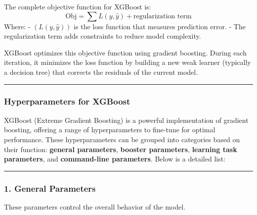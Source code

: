 \documentclass[12pt]{book}
\begin{document}
The complete objective function for XGBoost is: \[
\text{Obj} = \sum L(y, \hat{y}) + \text{regularization term}
\] Where: - \((L(y, \hat{y}))\) is the loss function that measures
prediction error. - The regularization term adds constraints to reduce
model complexity.

XGBoost optimizes this objective function using gradient boosting.
During each iteration, it minimizes the loss function by building a new
weak learner (typically a decision tree) that corrects the residuals of
the current model.

\begin{center}\rule{0.5\linewidth}{0.5pt}\end{center}

\subsubsection{Hyperparameters for
XGBoost}\label{hyperparameters-for-xgboost}

XGBoost (Extreme Gradient Boosting) is a powerful implementation of
gradient boosting, offering a range of hyperparameters to fine-tune for
optimal performance. These hyperparameters can be grouped into
categories based on their function: \textbf{general parameters},
\textbf{booster parameters}, \textbf{learning task parameters}, and
\textbf{command-line parameters}. Below is a detailed list:

\begin{center}\rule{0.5\linewidth}{0.5pt}\end{center}

\subsubsection{\texorpdfstring{\textbf{1. General
Parameters}}{1. General Parameters}}\label{general-parameters}

These parameters control the overall behavior of the model.
\end{document}
